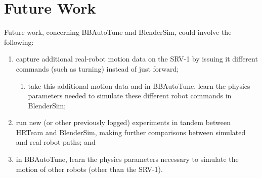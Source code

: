 \section{Future Work}

Future work, concerning BBAutoTune and BlenderSim, could involve the following:
\begin{enumerate}
 \item capture additional real-robot motion data on the SRV-1 by issuing it different commands (such as turning) instead of just forward;
 \begin{enumerate}
  \item take this additional motion data and in BBAutoTune, learn the physics parameters needed to simulate these different robot commands in BlenderSim;
 \end{enumerate}
 \item run new (or other previously logged) experiments in tandem between HRTeam and BlenderSim, making further comparisons between simulated and real robot paths; and
 \item in BBAutoTune, learn the physics parameters necessary to simulate the motion of other robots (other than the SRV-1).
\end{enumerate}


